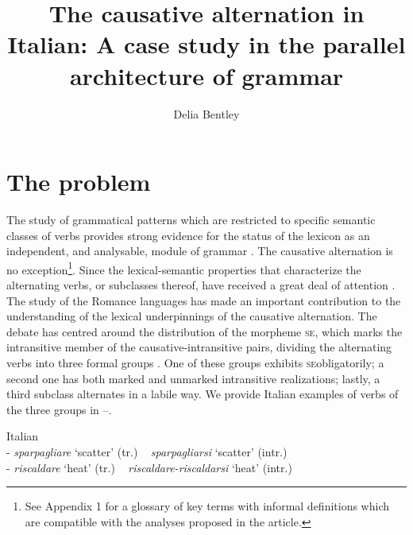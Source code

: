 \documentclass[output=paper,colorlinks,citecolor=brown
]{langscibook}
\author{Delia Bentley\orcid{}\affiliation{University of Manchester}}
\title[The causative alternation in Italian]{The causative alternation in Italian: A case study in the parallel architecture of grammar}
\begin{document}
\maketitle


\section{The problem}\label{bentley_section_1}
\begin{sloppypar}
The study of grammatical patterns which are restricted to specific semantic classes of verbs provides strong evidence for the status of the lexicon as an independent, and analysable, module of grammar \citep{pinker1989learnability,pinker2013secret,levin1993english}. The causative alternation is no exception\footnote{See Appendix 1 for a glossary of key terms with informal definitions which are compatible with the analyses proposed in the article.}.  Since \citet[332–337]{jespersen1927modern} the lexical-semantic properties that characterize the alternating verbs, or subclasses thereof, have received a great deal of attention \citep[etc.]{haspelmath1993more,levin1995unaccusativity,kiparsky1997remarks,chierchia1989semantics,comrie2006transitivity,schafer2009causative,samardzic2012meaning}. The study of the Romance languages has made an important contribution to the understanding of the lexical underpinnings of the causative alternation. The debate has centred around the distribution of the morpheme \textsc{se}, which marks the intransitive member of the causative-intransitive pairs, dividing the alternating verbs into three formal groups \citep[etc.]{zribi1987reflexivite,labelle1992change,alexiadou2006properties, alexiadou2015external, legendre2010french,cennamo2011anticausative,cennamo2012aspectual,kailuweit2012construcciones,martin2014anticausatives,vivanco2021scalar}. One of these groups exhibits \textsc{se}obligatorily; a second one has both marked and unmarked intransitive realizations; lastly, a third subclass alternates in a labile way. We provide Italian examples of verbs of the three groups in --.
\end{sloppypar}

\ea
\label{bentley_example_1}
Italian\\
\ea	\label{bentley_example_1a}  - \textit{sparpagliare} ‘scatter’ (tr.) ~ \textit{sparpagliarsi} ‘scatter’ (intr.) \\

\ex	\label{bentley_example_1b} 
 - \textit{riscaldare} ‘heat’ (tr.) ~ \textit{riscaldare-riscaldarsi} ‘heat’ (intr.)  \\
\end{document}
